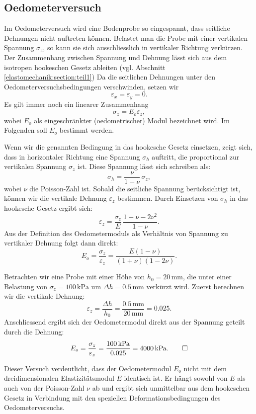\subsection{Oedometerversuch}
Im Oedometerversuch wird eine Bodenprobe so eingespannt, dass
%
seitliche Dehnungen nicht auftreten können.
Belastet man die Probe mit einer vertikalen Spannung \(\sigma_z\),
so kann sie sich ausschliesslich in vertikaler Richtung verkürzen.
Der Zusammenhang zwischen Spannung und Dehnung lässt sich aus dem
isotropen hookeschen Gesetz ableiten
(vgl. Abschnitt \ref{elastomechanik:section:teil1})
Da die seitlichen Dehnungen unter den Oedometerversuchsbedingungen
verschwinden, setzen wir
\[
  \varepsilon_x = \varepsilon_y = 0.
\]
Es gilt immer noch ein linearer Zusammenhang
\[
  \sigma_z = E_o \varepsilon_z,%
\]
wobei \(E_{o}\) als eingeschränkter (oedometrischer) Modul
bezeichnet wird.
%
%
Im Folgenden soll \(E_{o}\) bestimmt werden.

Wenn wir die genannten Bedingung in das hookesche Gesetz einsetzen,
zeigt sich, dass in horizontaler Richtung eine Spannung \(\sigma_h\)
auftritt, die proportional zur vertikalen Spannung \(\sigma_z\)
ist.
Diese Spannung lässt sich schreiben als:
\[
  \sigma_h = \frac{\nu}{1-\nu}\,\sigma_z,
\]
wobei \(\nu\) die Poisson-Zahl ist.  
Sobald die seitliche Spannung berücksichtigt ist, können wir die
vertikale Dehnung \(\varepsilon_z\) bestimmen.
Durch Einsetzen von \(\sigma_h\) in das hookesche Gesetz ergibt sich:
\[
  \varepsilon_z = \frac{\sigma_z}{E}\,\frac{1-\nu-2\nu^2}{1-\nu}.
\]
Aus der Definition des Oedometermoduls als Verhältnis von Spannung
zu vertikaler Dehnung folgt dann direkt:
\[
  E_o = \frac{\sigma_z}{\varepsilon_z} = \frac{E(1-\nu)}{(1+\nu)(1-2\nu)}.
\]

\begin{beispiel}   
Betrachten wir eine Probe mit einer Höhe von \(h_0 = 20\,\mathrm{mm}\),
die unter einer Belastung von \(\sigma_z = 100\,\mathrm{kPa}\) um
\(\Delta h = 0.5\,\mathrm{mm}\) verkürzt wird.
Zuerst berechnen wir die vertikale Dehnung:
\[
  \varepsilon_z
= \frac{\Delta h}{h_0}
= \frac{0.5\,\mathrm{mm}}{20\,\mathrm{mm}} = 0.025.
\]
Anschliessend ergibt sich der Oedometermodul direkt aus der Spannung
geteilt durch die Dehnung:
\[
  E_o = \frac{\sigma_z}{\varepsilon_z}
=
\frac{100\,\mathrm{kPa}}{0.025} = 4000\,\mathrm{kPa}.
\qedhere
\]
\end{beispiel}  
Dieser Versuch verdeutlicht, dass der Oedometermodul \(E_o\) nicht
mit dem dreidimensionalen Elastizitätsmodul \(E\) identisch ist.
Er hängt sowohl von \(E\) als auch von der Poisson-Zahl \(\nu\) ab
und ergibt sich unmittelbar aus dem hookeschen Gesetz in Verbindung
mit den speziellen Deformationsbedingungen des Oedometerversuchs.

